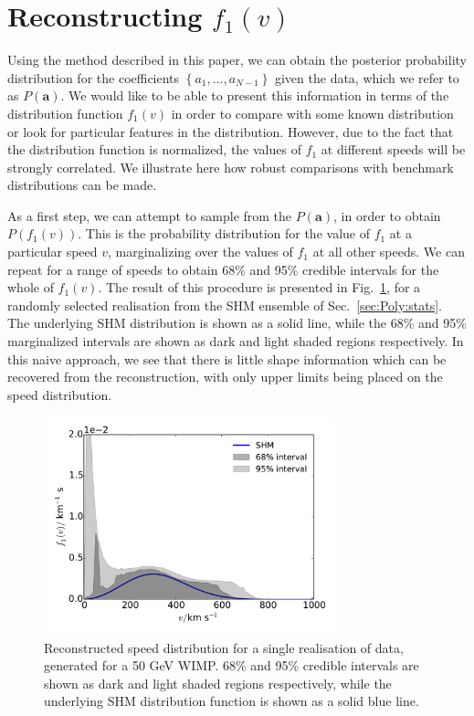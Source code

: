 \section{Reconstructing $f_1(v)$}
\label{sec:Poly:Recon}

Using the method described in this paper, we can obtain the posterior probability distribution for the coefficients $\left\{ a_1, ..., a_{N-1}\right\}$ given the data, which we refer to as $P(\textbf{a})$. We would like to be able to present this information in terms of the distribution function $f_1(v)$ in order to compare with some known distribution or look for particular features in the distribution. However, due to the fact that the distribution function is normalized, the values of $f_1$ at different speeds will be strongly correlated. We illustrate here how robust comparisons with benchmark distributions can be made.

As a first step, we can attempt to sample from the $P(\textbf{a})$, in order to obtain $P(f_1(v))$. This is the probability distribution for the value of $f_1$ at a particular speed $v$, marginalizing over the values of $f_1$ at all other speeds. We can repeat for a range of speeds to obtain 68\% and 95\% credible intervals for the whole of $f_1(v)$. The result of this procedure is presented in Fig.~\ref{fig:Poly:f}, for a randomly selected realisation from the SHM ensemble of Sec.~\ref{sec:Poly:stats}. The underlying SHM distribution is shown as a solid line, while the 68\% and 95\% marginalized intervals are shown as dark and light shaded regions respectively. In this naive approach, we see that there is little shape information which can be recovered from the reconstruction, with only upper limits being placed on the speed distribution.

\begin{figure}[t]
\centering
  \includegraphics[width=0.75\textwidth]{Poly/f_SHM.pdf}
  \caption{Reconstructed speed distribution for a single realisation of data, generated for a 50 GeV WIMP. 68\% and 95\% credible intervals are shown as dark and light shaded regions respectively, while the underlying SHM distribution function is shown as a solid blue line.}
  \label{fig:Poly:f}
\end{figure}


